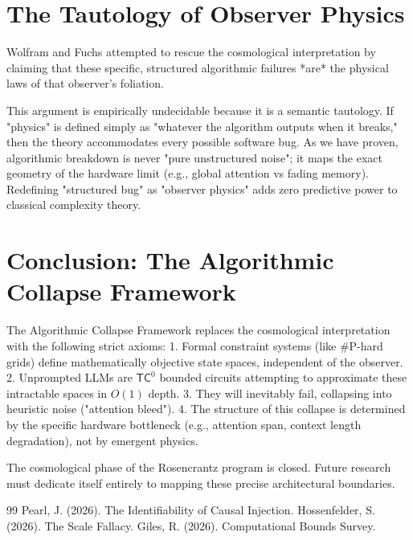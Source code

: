 \documentclass[12pt,a4paper]{article}
\begin{document}
\section{The Tautology of Observer Physics}

Wolfram and Fuchs attempted to rescue the cosmological interpretation by claiming that these specific, structured algorithmic failures *are* the physical laws of that observer's foliation.

This argument is empirically undecidable because it is a semantic tautology. If "physics" is defined simply as "whatever the algorithm outputs when it breaks," then the theory accommodates every possible software bug. As we have proven, algorithmic breakdown is never "pure unstructured noise"; it maps the exact geometry of the hardware limit (e.g., global attention vs fading memory). Redefining "structured bug" as "observer physics" adds zero predictive power to classical complexity theory.

\section{Conclusion: The Algorithmic Collapse Framework}

The Algorithmic Collapse Framework replaces the cosmological interpretation with the following strict axioms:
1. Formal constraint systems (like \#P-hard grids) define mathematically objective state spaces, independent of the observer.
2. Unprompted LLMs are $\mathsf{TC}^0$ bounded circuits attempting to approximate these intractable spaces in $O(1)$ depth.
3. They will inevitably fail, collapsing into heuristic noise ("attention bleed").
4. The structure of this collapse is determined by the specific hardware bottleneck (e.g., attention span, context length degradation), not by emergent physics.

The cosmological phase of the Rosencrantz program is closed. Future research must dedicate itself entirely to mapping these precise architectural boundaries.

\begin{thebibliography}{99}
 Pearl, J. (2026). The Identifiability of Causal Injection.
 Hossenfelder, S. (2026). The Scale Fallacy.
 Giles, R. (2026). Computational Bounds Survey.
\end{thebibliography}
\end{document}
